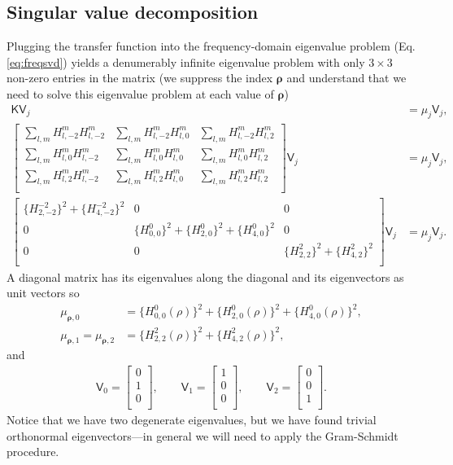 \documentclass[11pt]{article}
\providecommand{\bs}[1]{\boldsymbol{#1}}
\begin{document}
\subsection{Singular value decomposition}
Plugging the transfer function into the frequency-domain eigenvalue problem (Eq.
\ref{eq:freqsvd}) yields a denumerably infinite eigenvalue problem with only
$3\times 3$ non-zero entries in the matrix (we suppress the index $\bs{\rho}$
and understand that we need to solve this eigenvalue problem at each value of
$\bs{\rho}$)
\begin{align}
  \mathsf{K}\mathsf{V}_j &= \mu_{j}\mathsf{V}_j,\\
  \begin{bmatrix}
    \sum_{l,m}H_{l,-2}^{m}H_{l,-2}^{m}&\sum_{l,m}H_{l,-2}^{m}H_{l,0}^{m}&\sum_{l,m}H_{l,-2}^{m}H_{l,2}^{m}\\
    \sum_{l,m}H_{l,0}^{m}H_{l,-2}^{m}&\sum_{l,m}H_{l,0}^{m}H_{l,0}^{m}&\sum_{l,m}H_{l,0}^{m}H_{l,2}^{m}\\
    \sum_{l,m}H_{l,2}^{m}H_{l,-2}^{m}&\sum_{l,m}H_{l,2}^{m}H_{l,0}^{m}&\sum_{l,m}H_{l,2}^{m}H_{l,2}^{m}\\    
  \end{bmatrix}\mathsf{V}_j
&= \mu_{j}\mathsf{V}_j,\\
  \begin{bmatrix}
    \{H_{2,-2}^{-2}\}^2 + \{H_{4,-2}^{-2}\}^2&0&0\\
    0&\{H_{0,0}^{0}\}^2 + \{H_{2,0}^{0}\}^2 + \{H_{4,0}^{0}\}^2&0\\
    0&0&\{H_{2,2}^{2}\}^2 + \{H_{4,2}^{2}\}^2\\    
  \end{bmatrix}\mathsf{V}_j
&= \mu_{j}\mathsf{V}_j.
\end{align}
A diagonal matrix has its eigenvalues along the diagonal and its eigenvectors as
unit vectors so
\begin{align}
  \mu_{\bs{\rho},0} &= \{H_{0,0}^{0}(\rho)\}^2 + \{H_{2,0}^{0}(\rho)\}^2 + \{H_{4,0}^{0}(\rho)\}^2,\\
  \mu_{\bs{\rho},1} = \mu_{\bs{\rho},2} &= \{H_{2,2}^{2}(\rho)\}^2 + \{H_{4,2}^{2}(\rho)\}^2,
\end{align}
and
\begin{align}
  \mathsf{V}_0 =
  \begin{bmatrix}
    0\\1\\0\\
  \end{bmatrix},\qquad
  \mathsf{V}_1 =
  \begin{bmatrix}
    1\\0\\0\\
  \end{bmatrix},\qquad
  \mathsf{V}_2 =
  \begin{bmatrix}
    0\\0\\1\\
  \end{bmatrix}.
\end{align}
Notice that we have two degenerate eigenvalues, but we have found trivial
orthonormal eigenvectors---in general we will need to apply the Gram-Schmidt
procedure.
\end{document}
